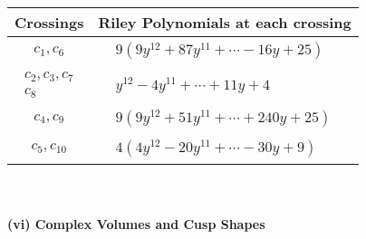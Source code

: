 \documentclass[1p]{elsarticle_modified}
\theoremstyle{definition}
\begin{document}
\begin{tabular}{m{50pt}|m{274pt}}
Crossings & \hspace{64pt}Riley Polynomials at each crossing \\
\hline $$\begin{aligned}c_{1},c_{6}\end{aligned}$$&$\begin{aligned}
&9(9 y^{12}+87 y^{11}+\cdots-16 y+25)
\end{aligned}$\\
\hline $$\begin{aligned}c_{2},c_{3},c_{7}\\c_{8}\end{aligned}$$&$\begin{aligned}
&y^{12}-4 y^{11}+\cdots+11 y+4
\end{aligned}$\\
\hline $$\begin{aligned}c_{4},c_{9}\end{aligned}$$&$\begin{aligned}
&9(9 y^{12}+51 y^{11}+\cdots+240 y+25)
\end{aligned}$\\
\hline $$\begin{aligned}c_{5},c_{10}\end{aligned}$$&$\begin{aligned}
&4(4 y^{12}-20 y^{11}+\cdots-30 y+9)
\end{aligned}$\\
\hline
\end{tabular}\\~\\
\newpage\flushleft \textbf{(vi) Complex Volumes and Cusp Shapes}
\end{document}
